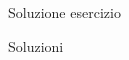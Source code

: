 \begin{frame}{Soluzione esercizio}

    \begin{exampleblock}{Soluzioni}
      
    \end{exampleblock}

\end{frame}
